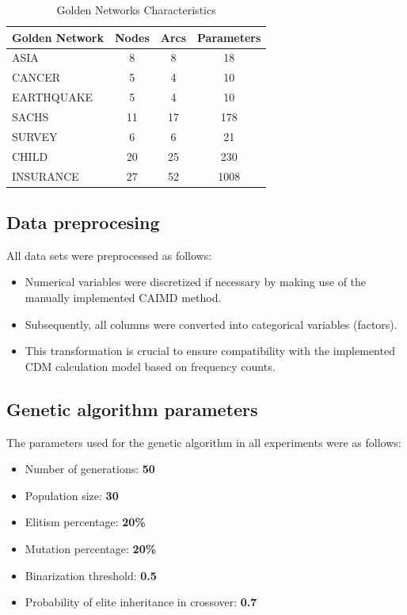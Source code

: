 \documentclass[runningheads]{llncs}
\begin{document}
\begin{table}[h!]
	\centering
	\caption{Golden Networks Characteristics}
	\begin{tabular}{|l|c|c|c|}
		\hline
		\textbf{Golden Network} & \textbf{Nodes} & \textbf{Arcs} & \textbf{Parameters} \\
		\hline
		ASIA & 8 & 8 & 18 \\
		\hline
		CANCER & 5 & 4 & 10 \\
		\hline
		EARTHQUAKE & 5 & 4 & 10 \\
		\hline
		SACHS & 11 & 17 & 178 \\
		\hline
		SURVEY & 6 & 6 & 21 \\
		\hline
		CHILD & 20 & 25 & 230 \\
		\hline
		INSURANCE & 27 & 52 & 1008 \\
		\hline
	\end{tabular}
\end{table}

\subsection{Data preprocesing}

All data sets were preprocessed as follows:

\begin{itemize}
	\item Numerical variables were discretized if necessary by making use of the manually implemented CAIMD method.
	
	\item Subsequently, all columns were converted into categorical variables (factors).

	\item This transformation is crucial to ensure compatibility with the implemented CDM calculation model based on frequency counts.
	
\end{itemize}

\subsection{Genetic algorithm parameters}

The parameters used for the genetic algorithm in all experiments were as follows:

\begin{itemize}
	\item Number of generations: \textbf{50}
	\item Population size: \textbf{30}
	\item Elitism percentage: \textbf{20\%}
	\item Mutation percentage: \textbf{20\%}
	\item Binarization threshold: \textbf{0.5}
	\item Probability of elite inheritance in crossover: \textbf{0.7}
\end{itemize}
\end{document}
